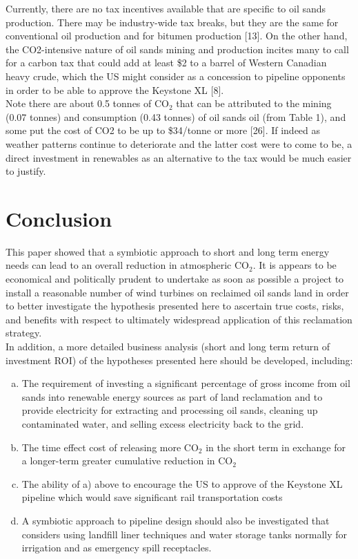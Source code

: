 \documentclass[11pt]{article}
\begin{document}
Currently, there are no tax incentives available that are specific to oil sands production. There may be industry-wide tax breaks, but they are the same for conventional oil production and for bitumen production [13]. On the other hand, the CO2-intensive nature of oil sands mining and production incites many to call for a carbon tax that could add at least \$2 to a barrel of Western Canadian heavy crude, which the US might consider as a concession to pipeline opponents in order to be able to approve the Keystone XL [8].   \\

Note there are about 0.5 tonnes of CO$_2$ that can be attributed to the mining (0.07 tonnes) and consumption (0.43 tonnes) of oil sands oil (from Table 1), and some put the cost of CO2 to be up to \$34/tonne or more [26]. If indeed as weather patterns continue to deteriorate and the latter cost were to come to be, a direct investment in renewables as an alternative to the tax would be much easier to justify. 


\section{Conclusion}
This paper showed that a symbiotic approach to short and long term energy needs can lead to an overall reduction in atmospheric CO$_2$. It is appears to be economical and politically prudent to undertake as soon as possible a project to install a reasonable number of wind turbines on reclaimed oil sands land in order to better investigate the hypothesis presented here to ascertain true costs, risks, and benefits with respect to ultimately widespread application of this reclamation strategy.\\

In addition, a more detailed business analysis (short and long term return of investment ROI) of the hypotheses presented here should be developed, including:

\begin{enumerate}[a)]
\item The requirement of investing a significant percentage of gross income from oil sands into renewable energy sources as part of land reclamation and to provide electricity for extracting and processing oil sands, cleaning up contaminated water, and selling excess electricity back to the grid. 
\item The time effect cost of releasing more CO$_2$ in the short term in exchange for a longer-term greater cumulative reduction in CO$_2$
\item The ability of a) above to encourage the US to approve of the Keystone XL pipeline which would save significant rail transportation costs
\item A symbiotic approach to pipeline design should also be investigated that considers using landfill liner techniques and water storage tanks normally for irrigation and as emergency spill receptacles.
\end{enumerate}
\end{document}
